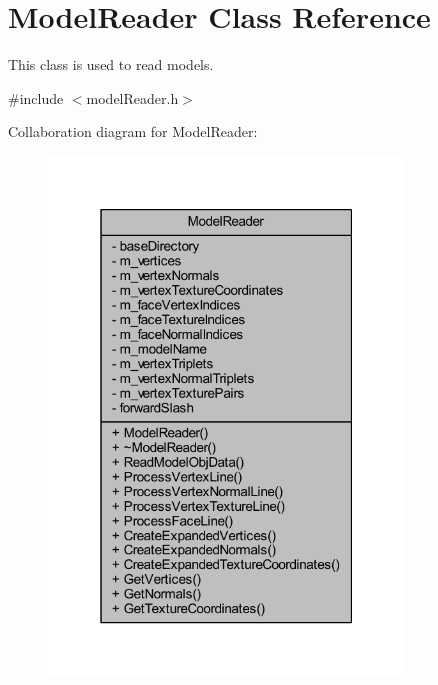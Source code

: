 \hypertarget{class_model_reader}{}\section{Model\+Reader Class Reference}
\label{class_model_reader}


This class is used to read models.  




{\ttfamily \#include $<$model\+Reader.\+h$>$}



Collaboration diagram for Model\+Reader\+:\nopagebreak
\begin{figure}[H]
\begin{center}
\leavevmode
\includegraphics[width=268pt]{class_model_reader__coll__graph}
\end{center}
\end{figure}
